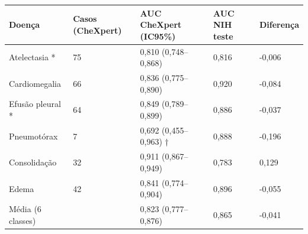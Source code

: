 \begin{tabular}{lllll}
\toprule
Doença & Casos (CheXpert) & AUC CheXpert (IC95\%) & AUC NIH teste & Diferença \\
\midrule
Atelectasia * & 75 & 0,810 (0,748–0,868) & 0,816 & -0,006 \\
Cardiomegalia & 66 & 0,836 (0,775–0,890) & 0,920 & -0,084 \\
Efusão pleural * & 64 & 0,849 (0,789–0,899) & 0,886 & -0,037 \\
Pneumotórax & 7 & 0,692 (0,455–0,963) † & 0,888 & -0,196 \\
Consolidação & 32 & 0,911 (0,867–0,949) & 0,783 & 0,129 \\
Edema & 42 & 0,841 (0,774–0,904) & 0,896 & -0,055 \\
Média (6 classes) &  & 0,823 (0,777–0,876) & 0,865 & -0,041 \\
\bottomrule
\end{tabular}

